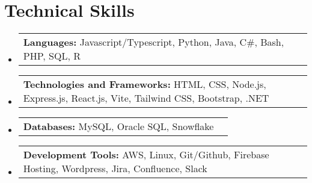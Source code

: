 \documentclass[letterpaper,11pt]{article}
\makeatletter
\newcommand{\resumeSubItem}[2]{ %
  \item
    \begin{tabular*}{\textwidth}{@{}l@{}l}
      {\small\textbf{#1}} {\small #2} \\ %
    \end{tabular*}\vspace{-5pt}
}
\newcommand{\resumeSubHeadingListStart}{\begin{itemize}[leftmargin=0.0in, label={}]}
\newcommand{\resumeSubHeadingListEnd}{\end{itemize}}
\makeatother
\begin{document}
\section{Technical Skills}
  \resumeSubHeadingListStart
    \resumeSubItem{Languages:}
      {Javascript/Typescript, Python, Java, C\#, Bash, PHP, SQL, R}
    \resumeSubItem{Technologies and Frameworks:}
      {HTML, CSS, Node.js, Express.js, React.js, Vite, Tailwind CSS, Bootstrap, .NET}
    \resumeSubItem{Databases:}
      {MySQL, Oracle SQL, Snowflake}
    \resumeSubItem{Development Tools:}
      {AWS, Linux, Git/Github, Firebase Hosting, Wordpress, Jira, Confluence, Slack}
  \resumeSubHeadingListEnd
\end{document}

